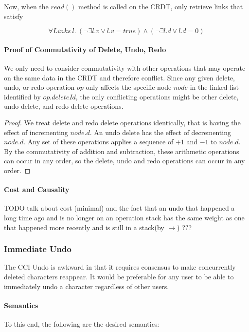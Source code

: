 \documentclass[12pt,a4paper,twoside,openright]{report}
\begin{document}
			Now, when the $read()$ method is called on the CRDT, only retrieve links that satisfy
			
				\[\forall Links\ l.\  (\lnot\exists l.v \lor l.v = true) \land (\lnot\exists l.d \lor l.d = 0 ) \] 
			
			\paragraph{Proof of Commutativity of Delete, Undo, Redo}
			We only need to consider commutativity with other operations that may operate on the same data in the CRDT and therefore conflict. Since any given delete, undo, or redo operation $op$ only affects the specific node $node$ in the linked list identified by $op.deleteId$, the only conflicting operations might be other delete, undo delete, and redo delete operations.
			
			\begin{proof}
				We treat delete and redo delete operations identically, that is having the effect of incrementing $node.d$. An undo delete has the effect of decrementing $node.d$. Any set of these operations applies a sequence of $+1$ and $-1$ to $node.d$. By the commutativity of addition and subtraction, these arithmetic operations can occur in any order, so the delete, undo and redo operations can occur in any order.
			\end{proof}
			
			\paragraph{Cost and Causality}
			TODO
			talk about cost (minimal) and the fact that an undo that happened a long time ago and is no longer on an operation stack has the same weight as one that happened more recently and is still in a stack(by $\rightarrow$) ??? 
			
		\subsubsection{Immediate Undo}
		The CCI Undo is awkward in that it requires consensus to make concurrently deleted characters reappear. It would be preferable for any user to be able to immediately undo a character regardless of other users.
		
			\paragraph{Semantics}
			To this end, the following are the desired semantics:
			
\end{document}
